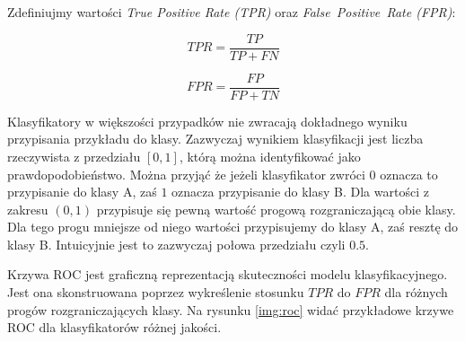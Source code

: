 \documentclass[a4paper, twoside, 11pt, openright]{article}
\begin{document}
\bigskip


Zdefiniujmy wartości \textit{True Positive Rate (TPR)} oraz \textit{False\ Positive\ Rate (FPR)}:

$$ TPR = \frac{TP}{TP+FN}$$

$$FPR = \frac{FP}{FP+TN} $$

Klasyfikatory w większości przypadków nie zwracają dokładnego wyniku przypisania przykładu do klasy. Zazwyczaj wynikiem klasyfikacji jest liczba rzeczywista z przedziału $[0, 1]$, którą można identyfikować jako prawdopodobieństwo. Można przyjąć że jeżeli klasyfikator zwróci $0$ oznacza to przypisanie do klasy A, zaś $1$ oznacza przypisanie do klasy B. Dla wartości z zakresu $(0, 1)$ przypisuje się pewną wartość progową rozgraniczającą obie klasy. Dla tego progu mniejsze od niego wartości przypisujemy do klasy A, zaś resztę do klasy B. Intuicyjnie jest to zazwyczaj połowa przedziału czyli $0.5$.

Krzywa ROC jest graficzną reprezentacją skuteczności modelu klasyfikacyjnego. Jest ona skonstruowana poprzez wykreślenie stosunku $TPR$ do $FPR$ dla różnych progów rozgraniczających klasy. Na rysunku \ref{img:roc} widać przykładowe krzywe ROC dla klasyfikatorów różnej jakości.
\end{document}
